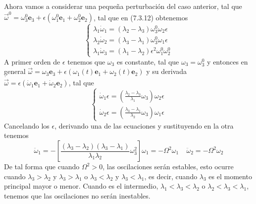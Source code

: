 Ahora vamos a considerar una pequeña perturbación del caso anterior, tal que $\vec{\omega}^0 = \omega_3^0 \mathbf{e}_3 + \epsilon (\omega_1^0 \mathbf{e}_1+\omega_2^0\mathbf{e}_2)$, tal que en (7.3.12) obtenemos
\begin{equation} \label{6.1.1}
    \left\{\begin{matrix}
        \lambda_1 \dot{\omega}_1 = (\lambda_2-\lambda_3) \omega_3^0 \omega_2 \epsilon \\
        \lambda_2 \dot{\omega}_2 = (\lambda_3-\lambda_1) \omega_3^0 \omega_1 \epsilon\\
        \lambda_1 \dot{\omega}_3 = (\lambda_1-\lambda_2) \epsilon^2 \omega_1^0 \omega_2^0 
    \end{matrix}\right.
\end{equation}
A primer orden de $\epsilon$ tenemos que $\omega_3$ es constante, tal que $\omega_3 = \omega_3^0$ y entonces en general $\vec{\omega} = \omega_3 \mathbf{e}_3 + \epsilon (\omega_1(t) \mathbf{e}_1+\omega_2(t)\mathbf{e}_2)$ y su derivada $\dot{\vec{\omega}}= \epsilon(\dot{\omega}_1 \mathbf{e}_1+\dot{\omega}_2\mathbf{e}_2)$, tal que 
\begin{equation} \label{6.1.1}
    \left\{\begin{matrix}
        \dot{\omega}_1 \epsilon = \left(\frac{\lambda_2-\lambda_3}{\lambda_1} \omega_3\right) \omega_2 \epsilon \\
        \dot{\omega}_2 \epsilon = \left(\frac{\lambda_3-\lambda_1}{\lambda_2} \omega_3\right)  \omega_1 \epsilon
    \end{matrix}\right.
\end{equation}
Cancelando los $\epsilon$, derivando una de las ecuaciones y sustituyendo en la otra tenemos 
\begin{equation} \label{6.1.1}
    \ddot{\omega}_1 = -\left[\frac{(\lambda_3-\lambda_2)(\lambda_3-\lambda_1)}{\lambda_1 \lambda_2} \omega_3^2\right] \omega_1 = - \Omega^2 \omega_1 \ \ \ \ \ \ddot{\omega}_2 = - \Omega^2 \omega_2
\end{equation}
De tal forma que cuando $\Omega^2 >0$, las oscilaciones serán estables, esto ocurre cuando $\lambda_3 > \lambda_2$ y $\lambda_3 > \lambda_1$ o $\lambda_3 < \lambda_2$ y $\lambda_3 < \lambda_1$, es decir, cuando $\lambda_3$ es el momento principal mayor o menor. Cuando es el intermedio, $\lambda_1 < \lambda_3 < \lambda_2$ o $\lambda_2 < \lambda_3 < \lambda_1$, tenemos que las oscilaciones no serán inestables.

